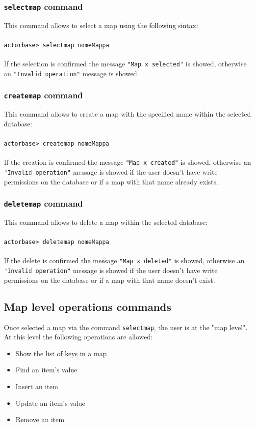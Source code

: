\documentclass[a4paper]{article}
\begin{document}
	\subsubsection{\texttt{selectmap} command}
	This command allows to select a map using the following sintax:
	\\ \\
	\texttt{actorbase>	selectmap nomeMappa}
	\\ \\
	If the selection is confirmed the message \texttt{"Map x selected"} is showed, otherwise an \texttt{"Invalid operation"} message is showed.

	\subsubsection{\texttt{createmap} command}
	This command allows to create a map with the specified name within the selected database:
	\\ \\
	\texttt{actorbase>	createmap nomeMappa}
	\\ \\
	If the creation is confirmed the message \texttt{"Map x created"} is showed, otherwise an \texttt{"Invalid operation"} message is showed if the user doesn't have write permissions on the database or if a map with that name already exists.
	
	\subsubsection{\texttt{deletemap} command}
	This command allows to delete  a map within the selected database:
	\\ \\
	\texttt{actorbase>	deletemap nomeMappa}
	\\ \\
	If the delete is confirmed the message \texttt{"Map x deleted"} is showed, otherwise an \texttt{"Invalid operation"} message is showed if the user doesn't have write permissions on the database or if a map with that name doesn't exist.
	

	\subsection{Map level operations commands}
	Once selected a map via the command \texttt{selectmap}, the user is at the "map level". At this level the following operations are allowed:
	\begin{itemize}
		\item Show the list of keys in a map
		\item Find an item's value
		\item Insert an item
		\item Update an item's value
		\item Remove an item
	\end{itemize}
\end{document}
